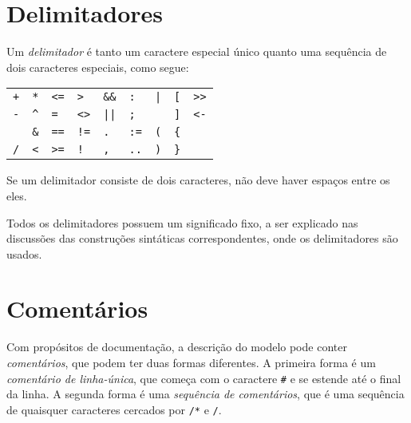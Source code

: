\documentclass[11pt, brazil]{report}
\begin{document}
\section{Delimitadores}

Um {\it delimitador} é tanto um caractere especial único quanto uma sequência
de dois caracteres especiais, como segue:


\noindent\hfil
\begin{tabular}{@{}p{.3in}p{.3in}p{.3in}p{.3in}p{.3in}p{.3in}p{.3in}
p{.3in}p{.3in}@{}}
{\tt+}&{\tt**}&{\tt<=}&{\tt>}&{\tt\&\&}&{\tt:}&{\tt|}&{\tt[}&
{\tt>>}\\
{\tt-}&{\tt\textasciicircum}&{\tt=}&{\tt<>}&{\tt||}&{\tt;}&
{\tt\char126}&{\tt]}&{\tt<-}\\
{\tt*}&{\tt\&}&{\tt==}&{\tt!=}&{\tt.}&{\tt:=}&{\tt(}&{\tt\{}\\
{\tt/}&{\tt<}&{\tt>=}&{\tt!}&{\tt,}&{\tt..}&{\tt)}&{\tt\}}\\
\end{tabular}

Se um delimitador consiste de dois caracteres, não deve haver espaços
entre os eles.

Todos os delimitadores possuem um significado fixo, a ser
explicado nas discussões das \linebreak construções sintáticas correspondentes,
onde os delimitadores são usados.

%

\section{Comentários}

Com propósitos de documentação, a descrição do modelo pode conter
{\it comentários}, que podem ter duas formas diferentes. A primeira forma é
um {\it comentário de linha-única}, que começa com o caractere {\tt\#}
e se estende até o final da linha. A segunda forma é uma {\it sequência de
comentários}, que é uma sequência de quaisquer caracteres cercados por
{\tt/*} e {\tt*/}.

\end{document}
